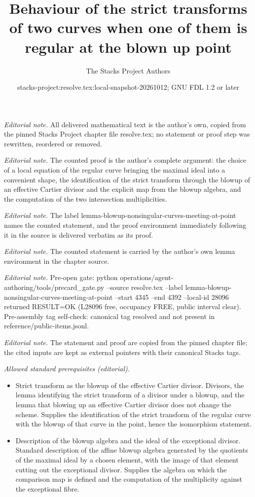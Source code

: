 \documentclass[10pt,a4paper]{amsart}
\title{Behaviour of the strict transforms of two curves when one of them is regular at the blown up point}
\author{The Stacks Project Authors}
\date{stacks-project:resolve.tex:local-snapshot-20261012; GNU FDL 1.2 or later}
\theoremstyle{plain}
\theoremstyle{definition}
\theoremstyle{remark}
\numberwithin{equation}{subsection}
\begin{document}
\maketitle
\noindent\textit{Editorial note.} All delivered mathematical text is the author's own, copied from the pinned Stacks Project chapter file resolve.tex; no statement or proof step was rewritten, reordered or removed.\par\medskip
\noindent\textit{Editorial note.} The counted proof is the author's complete argument: the choice of a local equation of the regular curve bringing the maximal ideal into a convenient shape, the identification of the strict transform through the blowup of an effective Cartier divisor and the explicit map from the blowup algebra, and the computation of the two intersection multiplicities.\par\medskip
\noindent\textit{Editorial note.} The label lemma-blowup-nonsingular-curves-meeting-at-point names the counted statement, and the proof environment immediately following it in the source is delivered verbatim as its proof.\par\medskip
\noindent\textit{Editorial note.} The counted statement is carried by the author's own lemma environment in the chapter source.\par\medskip
\noindent\textit{Editorial note.} Pre-open gate: python operations/agent-authoring/tools/precard\_gate.py --source resolve.tex --label lemma-blowup-nonsingular-curves-meeting-at-point --start 4345 --end 4392 --local-id 28096 returned RESULT=OK (L28096 free, occupancy FREE, public interval clear). Pre-assembly tag self-check: canonical tag resolved and not present in reference/public-items.jsonl.\par\medskip
\noindent\textit{Editorial note.} The statement and proof are copied from the pinned chapter file; the cited inputs are kept as external pointers with their canonical Stacks tags.\par\medskip
\noindent\textit{Allowed standard prerequisites (editorial).}\begin{itemize}
\item Strict transform as the blowup of the effective Cartier divisor. Divisors, the lemma identifying the strict transform of a divisor under a blowup, and the lemma that blowing up an effective Cartier divisor does not change the scheme. Supplies the identification of the strict transform of the regular curve with the blowup of that curve in the point, hence the isomorphism statement.
\item Description of the blowup algebra and the ideal of the exceptional divisor. Standard description of the affine blowup algebra generated by the quotients of the maximal ideal by a chosen element, with the image of that element cutting out the exceptional divisor. Supplies the algebra on which the comparison map is defined and the computation of the multiplicity against the exceptional fibre.
\end{itemize}\medskip
\end{document}
